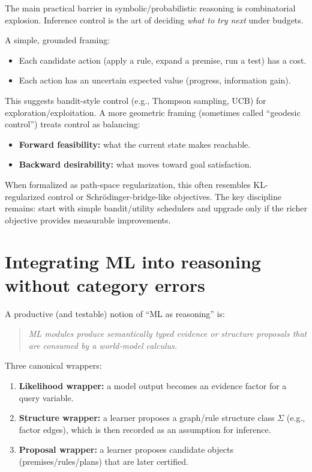 \documentclass[11pt]{article}
\begin{document}
The main practical barrier in symbolic/probabilistic reasoning is combinatorial explosion.
Inference control is the art of deciding \emph{what to try next} under budgets.

A simple, grounded framing:
\begin{itemize}[leftmargin=2em]
\item Each candidate action (apply a rule, expand a premise, run a test) has a cost.
\item Each action has an uncertain expected value (progress, information gain).
\end{itemize}

This suggests bandit-style control (e.g., Thompson sampling, UCB) for exploration/exploitation.
A more geometric framing (sometimes called ``geodesic control'') treats control as balancing:
\begin{itemize}[leftmargin=2em]
\item \textbf{Forward feasibility:} what the current state makes reachable.
\item \textbf{Backward desirability:} what moves toward goal satisfaction.
\end{itemize}

When formalized as path-space regularization, this often resembles KL-regularized control or Schr\"odinger-bridge-like objectives.
The key discipline remains: start with simple bandit/utility schedulers and upgrade only if the richer objective provides
measurable improvements.

\section{Integrating ML into reasoning without category errors}

A productive (and testable) notion of ``ML as reasoning'' is:

\begin{quote}
\emph{ML modules produce semantically typed evidence or structure proposals that are consumed by a world-model calculus.}
\end{quote}

Three canonical wrappers:
\begin{enumerate}[leftmargin=2em]
\item \textbf{Likelihood wrapper:} a model output becomes an evidence factor for a query variable.
\item \textbf{Structure wrapper:} a learner proposes a graph/rule structure class $\Sigma$ (e.g., factor edges),
which is then recorded as an assumption for inference.
\item \textbf{Proposal wrapper:} a learner proposes candidate objects (premises/rules/plans) that are later certified.
\end{enumerate}
\end{document}

